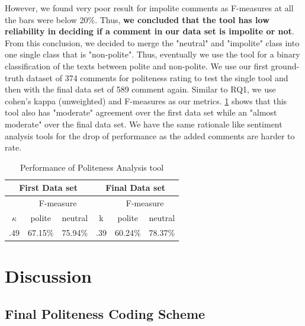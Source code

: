 However, we found very poor result for impolite comments as F-measures at all the bars were below 20\%. Thus, \textbf{we concluded that the tool has low reliability in deciding if a comment in our data set is impolite or not}. From this conclusion, we decided to merge the "neutral" and "impolite" class into one single class that is "non-polite". Thus, eventually we use the tool for a binary classification of the texts between polite and non-polite.
We use our first ground-truth dataset of 374 comments for politeness rating to test the single tool and then with the final data set of 589 comment again. Similar to RQ1, we use cohen's kappa (unweighted) and F-measures as our metrics. \ref{polresult} shows that this tool also has "moderate" agreement over the first data set while an "almost moderate" over the final data set. We have the same rationale like sentiment analysis tools for the drop of performance as the added comments are harder to rate.  

\vspace{3mm}
\noindent{}

\begin{table}
\centering
\caption{Performance of Politeness Analysis tool}
\label{polresult}
\begin{tabular}{|c|c|c|c|c|c|}
\hline
\multicolumn{3}{|c|}{ First Data set }& \multicolumn{3}{c|}{ Final Data set } \\
\hline
 & \multicolumn{2}{c|}{ F-measure } & & \multicolumn{2}{c|}{ F-measure } \\
 \hline
$\kappa$ & polite & neutral & k & polite & neutral \\
\hline
.49 & 67.15\% & 75.94\% & .39 & 60.24\% & 78.37\%\\
\hline
\end{tabular}
\end{table}

\section{Discussion}
\subsection{Final Politeness Coding Scheme} \label{finalpolscheme}

